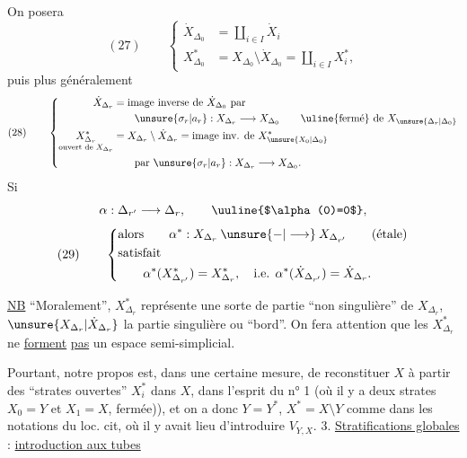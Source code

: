 On posera
\[
(27)\qquad
\left\{\begin{aligned}
\dot X_{\Delta_0}&=\coprod_{i\in I}\dot X_i\\
X_{\Delta_0}^*&=X_{\Delta_0}\setminus\dot X_{\Delta_0}=\coprod_{i\in I}X_i^*,
\end{aligned}\right.
\]
puis  plus généralement
\[
(28)\qquad
\left\{\begin{aligned}
\dot X_{\Delta_r}&=\text{image inverse de }\dot X_{\Delta_0}\text{ par}\\
&\qquad\unsure{\sigma_r|a_r}:X_{\Delta_r}\longrightarrow X_{\Delta_0}
\qquad\text{\uline{fermé} de }X_{\unsure{\Delta_r|\Delta_0}}\\
\underset{\text{ouvert de }X_{\Delta_r}}{X_{\Delta_r}^*}&=X_{\Delta_r}\setminus\dot X_{\Delta_r}=\text{image inv. de }X_{\unsure{X_0|\Delta_0}}^*\\
&\qquad\text{par }\unsure{\sigma_r|a_r}:X_{\Delta_r}\longrightarrow X_{\Delta_0}.
\end{aligned}\right.
\]
Si
\[
\alpha:\Delta_{r'}\longrightarrow\Delta_r,\qquad \uuline{$\alpha(0)=0$},
\]
\[
(29)\qquad\left\{\begin{aligned}
&\text{alors}\qquad \alpha^*:X_{\Delta_r}\mathbin{\unsure{-|\longrightarrow}}X_{\Delta_{r'}}\qquad(\text{étale})\\
&\text{satisfait}\\
&\qquad\alpha^*(X_{\Delta_{r'}}^*)=X_{\Delta_r}^*,\quad\text{i.e. }\alpha^*(\dot X_{\Delta_{r'}})=\dot X_{\Delta_r}.
\end{aligned}\right.
\]


\uline{NB} ``Moralement'', $X_{\Delta_r}^*$ représente une sorte de partie ``non singulière'' de $X_{\Delta_r}$, $\unsure{X_{\Delta_r}|\dot X_{\Delta_r}}$ la partie singulière ou ``bord''. On fera attention que les $X_{\Delta_r}^*$ ne \uline{forment} \uline{pas} un espace semi-simplicial.

Pourtant, notre propos est, dans une certaine mesure, de reconstituer $X$ à partir des ``strates ouvertes'' $X_i^*$ dans $X$, dans l'esprit du n° 1 (où il y a deux strates $X_0=Y$ et $X_1=X$,   fermée)), et on a donc $Y=Y^*$, $X^*=X\setminus Y$ comme dans les notations du loc. cit, où il y avait lieu d'introduire $V_{Y,X}$.
3. \uline{Stratifications globales} : \uline{introduction aux tubes}

